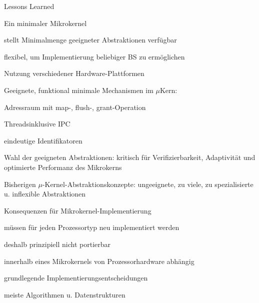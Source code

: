 \documentclass[a4paper]{article}
\begin{document}
\begin{multicols}{3}
    Lessons Learned
    \begin{enumerate*}
        \item Ein minimaler Mikrokernel
        \begin{itemize*}
            \item stellt Minimalmenge geeigneter Abstraktionen verfügbar
            \item flexibel, um Implementierung beliebiger BS zu ermöglichen
            \item Nutzung verschiedener Hardware-Plattformen
        \end{itemize*}
        \item Geeignete, funktional minimale Mechanismen im $\mu$Kern:
        \begin{itemize*}
            \item Adressraum mit map-, flush-, grant-Operation
            \item Threadsinklusive IPC
            \item eindeutige Identifikatoren
        \end{itemize*}
        \item Wahl der geeigneten Abstraktionen: kritisch für Verifizierbarkeit, Adaptivität und optimierte Performanz des Mikrokerns
        \item Bisherigen $\mu$-Kernel-Abstraktionskonzepte: ungeeignete, zu viele, zu spezialisierte u. inflexible Abstraktionen
        \item Konsequenzen für Mikrokernel-Implementierung
        \begin{itemize*}
            \item müssen für jeden Prozessortyp neu implementiert werden
            \item deshalb prinzipiell nicht portierbar %
        \end{itemize*}
        \item innerhalb eines Mikrokernels von Prozessorhardware abhängig
        \begin{enumerate*}
            \item grundlegende Implementierungsentscheidungen
            \item meiste Algorithmen u. Datenstrukturen
        \end{enumerate*}
    \end{enumerate*}


\end{multicols}
\end{document}
